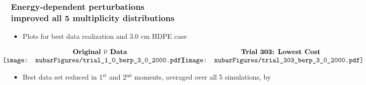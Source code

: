 \begin{frame}
\frametitle{Energy-dependent \nubar perturbations   \\ improved all 5 multiplicity
distributions}
\begin{itemize}
    \item Plots for best data realization and 3.0 cm HDPE case
\end{itemize}
\begin{center}
$\begin{array}{cc} \textbf{Original \nubar Data} & \hspace{0.13in}\textbf{Trial 303: Lowest Cost} \\
   \hspace{-0.25in}
\texttt{[image: nubarFigures/trial\_1\_0\_berp\_3\_0\_2000.pdf]} &
\hspace{-0.2in}\texttt{[image: nubarFigures/trial\_303\_berp\_3\_0\_2000.pdf]} \\
\end{array}$
\begin{itemize} 
	\item Best data set reduced  in {1$^{\text{st}}$} and {2$^{\text{nd}}$} moments, averaged over all 5 simulations, by 
\end{itemize}
\end{center}
\end{frame}


\logo{}

%
%	


